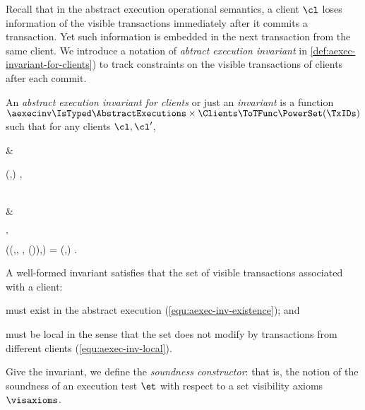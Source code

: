 Recall that in the abstract execution operational semantics,
a client \( \cl \) loses information of the visible transactions immediately after it commits a transaction.
Yet such information is embedded in the next transaction from the same client.
We introduce a notation of \emph{abtract execution invariant} in \cref{def:aexec-invariant-for-clients})
to track constraints on the visible transactions of clients after each commit.

\begin{definition}
\label{def:aexec-invariant-for-clients}
An \emph{abstract execution invariant for clients} or just an \emph{invariant} is a 
function \( \aexecinv \IsTyped \AbstractExecutions \times \Clients \ToTFunc \PowerSet(\TxIDs)\) 
such that for any clients \(\cl, \cl'\),
\begin{Formulae}
& \begin{Formula}
    \aexecinv(\aexec,\cl) \subseteq \aexec ,
    \label{equ:aexec-inv-existence}
\end{Formula}
\\ & \begin{Formula}
    \Forall{ \txidset \subseteq \aexec | \fp \in \Fingerprints
                | \idx \in \Indexs | \txid[\cl'](\idx) \in \TxIDs }
    \cl \neq \cl' 
    \\ \implies
    \aexecinv(\UpdateAExec(\aexec,\txidset, \fp, \txid[\cl'](\idx)),\cl) = \aexecinv(\aexec,\cl) .
    \label{equ:aexec-inv-local}
\end{Formula}
\end{Formulae}
\end{definition}

A well-formed invariant satisfies that the set of visible transactions associated with a client:
\begin{enumerate*}
\item must exist in the abstract execution (\cref{equ:aexec-inv-existence}); and
\item must be local in the sense that the set does not modify by transactions from different clients (\cref{equ:aexec-inv-local}).
\end{enumerate*}
Give the invariant, we define the \emph{soundness constructor}:
that is, the notion of the soundness of an execution test \( \et \) 
with respect to a set visibility axioms \( \visaxioms \).

